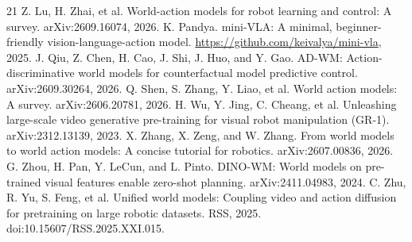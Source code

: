 \documentclass[11pt]{article}
\begin{document}
{\begin{thebibliography}{21}
 Z. Lu, H. Zhai, et al. World-action models for robot learning and control: A survey. arXiv:2609.16074, 2026.
 K. Pandya. mini-VLA: A minimal, beginner-friendly vision-language-action model. \url{https://github.com/keivalya/mini-vla}, 2025.
 J. Qiu, Z. Chen, H. Cao, J. Shi, J. Huo, and Y. Gao. AD-WM: Action-discriminative world models for counterfactual model predictive control. arXiv:2609.30264, 2026.
 Q. Shen, S. Zhang, Y. Liao, et al. World action models: A survey. arXiv:2606.20781, 2026.
 H. Wu, Y. Jing, C. Cheang, et al. Unleashing large-scale video generative pre-training for visual robot manipulation (GR-1). arXiv:2312.13139, 2023.
 X. Zhang, X. Zeng, and W. Zhang. From world models to world action models: A concise tutorial for robotics. arXiv:2607.00836, 2026.
 G. Zhou, H. Pan, Y. LeCun, and L. Pinto. DINO-WM: World models on pre-trained visual features enable zero-shot planning. arXiv:2411.04983, 2024.
 C. Zhu, R. Yu, S. Feng, et al. Unified world models: Coupling video and action diffusion for pretraining on large robotic datasets. RSS, 2025. doi:10.15607/RSS.2025.XXI.015.
\end{thebibliography}
}
\end{document}
